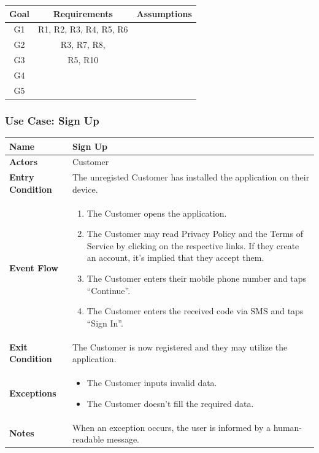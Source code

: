 \begin{center}
    \begin{tabular}{ |c||c|c| }
        \hline
        \textbf{Goal} & \textbf{Requirements} & \textbf{Assumptions} \\
        \hline
        G1 & R1, R2, R3, R4, R5, R6 & \\
        \hline
        G2 & R3, R7, R8, & \\
        \hline
        G3 & R5, R10 & \\
        \hline
        G4 & & \\
        \hline
        G5 & & \\
        \hline
    \end{tabular}
\end{center}

\def\arraystretch{1.5} %
\subsubsection{Use Case: Sign Up}
\begin{tabular}{|l|p{10cm}|}
    \hline
    \textbf{Name} & Sign Up \\
    \hline
    \textbf{Actors} & Customer \\
    \hline
    \textbf{Entry Condition} & The unregisted Customer has installed the application on their device. \\
    \hline
    \textbf{Event Flow} & \begin{enumerate}
        \item The Customer opens the application.
        \item The Customer may read Privacy Policy and the Terms of Service by clicking on the respective links. If they create an account, it's implied that they accept them.
        \item The Customer enters their mobile phone number and taps ``Continue''.
        \item The Customer enters the received code via SMS and taps ``Sign In''.
    \end{enumerate} \\
    \hline
    \textbf{Exit Condition} & The Customer is now registered and they may utilize the application. \\
    \hline
    \textbf{Exceptions} & \begin{itemize}
        \item The Customer inputs invalid data.
        \item The Customer doesn't fill the required data.
    \end{itemize} \\
    \hline
    \textbf{Notes} & When an exception occurs, the user is informed by a human-readable message. \\
    \hline
\end{tabular}


